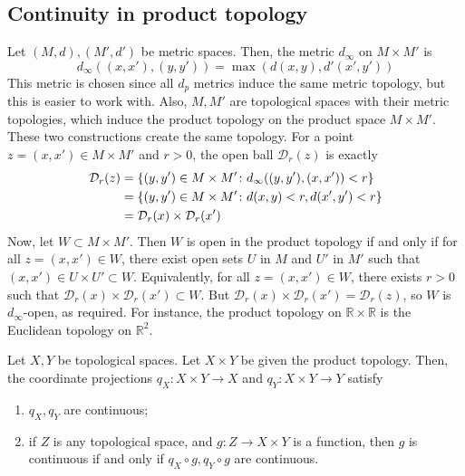 \subsection{Continuity in product topology}
\begin{example}
	Let \( (M, d), (M', d') \) be metric spaces.
	Then, the metric \( d_\infty \) on \( M \times M' \) is
	\[
		d_\infty((x,x'), (y,y')) = \max(d(x,y), d'(x',y'))
	\]
	This metric is chosen since all \( d_p \) metrics induce the same metric topology, but this is easier to work with.
	Also, \( M, M' \) are topological spaces with their metric topologies, which induce the product topology on the product space \( M \times M' \).
	These two constructions create the same topology.
	For a point \( z = (x,x') \in M \times M' \) and \( r > 0 \), the open ball \( \mathcal D_r(z) \) is exactly\
	\begin{align*}
		\mathcal D_r(z) & = \qty{(y,y') \in M \times M' \colon d_\infty((y,y'), (x,x')) < r} \\
		                & = \qty{(y,y') \in M \times M' \colon d(x,y) < r, d(x',y') < r}     \\
		                & = \mathcal D_r(x) \times \mathcal D_r(x')
	\end{align*}
	Now, let \( W \subset M \times M' \).
	Then \( W \) is open in the product topology if and only if for all \( z = (x,x') \in W \), there exist open sets \( U \) in \( M \) and \( U' \) in \( M' \) such that \( (x,x') \in U \times U' \subset W \).
	Equivalently, for all \( z = (x,x') \in W \), there exists \( r > 0 \) such that \( \mathcal D_r(x) \times \mathcal D_r(x') \subset W \).
	But \( \mathcal D_r(x) \times \mathcal D_r(x') = \mathcal D_r(z) \), so \( W \) is \( d_\infty \)-open, as required.
	For instance, the product topology on \( \mathbb R \times \mathbb R \) is the Euclidean topology on \( \mathbb R^2 \).
\end{example}
\begin{proposition}
	Let \( X, Y \) be topological spaces.
	Let \( X \times Y \) be given the product topology.
	Then, the coordinate projections \( q_X \colon X \times Y \to X \) and \( q_Y \colon X \times Y \to Y \) satisfy
	\begin{enumerate}
		\item \( q_X, q_Y \) are continuous;
		\item if \( Z \) is any topological space, and \( g \colon Z \to X \times Y \) is a function, then \( g \) is continuous if and only if \( q_X \circ g, q_Y \circ g \) are continuous.
	\end{enumerate}
\end{proposition}
